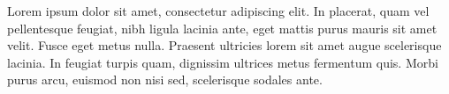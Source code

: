 {\noindent
  Lorem ipsum dolor sit amet, consectetur adipiscing elit. In placerat, quam vel pellentesque feugiat, nibh ligula lacinia ante, eget mattis purus mauris sit amet velit. Fusce eget metus nulla. Praesent ultricies lorem sit amet augue scelerisque lacinia. In feugiat turpis quam, dignissim ultrices metus fermentum quis. Morbi purus arcu, euismod non nisi sed, scelerisque sodales ante.
}
